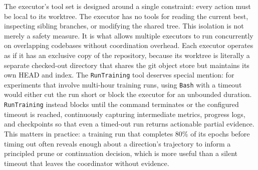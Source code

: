 \documentclass{llmxive}
\begin{document}
The executor's tool set is designed around a single constraint: every action
must be local to its worktree. The executor has no tools for reading the
current best, inspecting sibling branches, or modifying the shared tree. This
isolation is not merely a safety measure. It is what allows multiple
executors to run concurrently on overlapping codebases without coordination
overhead. Each executor operates as if it has an exclusive copy of the
repository, because its worktree is literally a separate checked-out
directory that shares the git object store but maintains its own HEAD and
index. The \texttt{RunTraining} tool deserves special mention: for experiments
that involve multi-hour training runs, using \texttt{Bash} with a timeout
would either cut the run short or block the executor for an unbounded
duration. \texttt{RunTraining} instead blocks until the command terminates
or the configured timeout is reached, continuously capturing intermediate
metrics, progress logs, and checkpoints so that even a timed-out run
returns actionable partial evidence. This matters in practice: a training
run that completes 80\% of its epochs before timing out often reveals enough
about a direction's trajectory to inform a principled prune or continuation
decision, which is more useful than a silent timeout that leaves the
coordinator without evidence.
\end{document}
